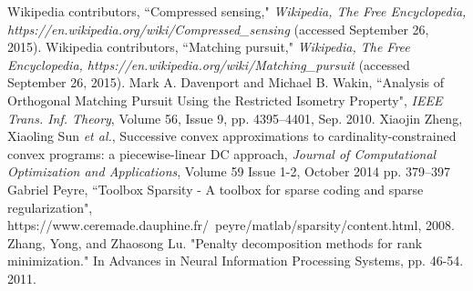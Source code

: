 \documentclass[letterpaper, 10 pt, conference]{article}
\begin{document}
\begin{thebibliography}{99}
 Wikipedia contributors, ``Compressed sensing," \textit{Wikipedia, The Free Encyclopedia, https://en.wikipedia.org/wiki/Compressed\_sensing} (accessed September 26, 2015).
 Wikipedia contributors, ``Matching pursuit," \textit{Wikipedia, The Free Encyclopedia, https://en.wikipedia.org/wiki/Matching\_pursuit} (accessed September 26, 2015).
 Mark A. Davenport and Michael B. Wakin, ``Analysis of Orthogonal Matching Pursuit Using the Restricted Isometry Property", \textit{IEEE Trans. Inf. Theory}, Volume 56,  Issue 9, pp. 4395--4401, Sep. 2010.
 	Xiaojin Zheng, Xiaoling Sun \textit{et al.}, Successive convex approximations to cardinality-constrained convex programs: a piecewise-linear DC approach, \textit{Journal of Computational Optimization and Applications}, Volume 59 Issue 1-2, October 2014 pp. 379--397
 Gabriel Peyre, ``Toolbox Sparsity - A toolbox for sparse coding and sparse regularization", https://www.ceremade.dauphine.fr/~peyre/matlab/sparsity/content.html, 2008.
 Zhang, Yong, and Zhaosong Lu. "Penalty decomposition methods for rank minimization." In Advances in Neural Information Processing Systems, pp. 46-54. 2011.
\end{thebibliography}
\end{document}

